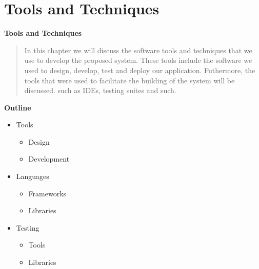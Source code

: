 
\section{Tools and Techniques}

\vspace{20mm}

\Huge{\textbf{Tools and Techniques}}

\vspace{20mm}




\begin{abstract}
    In this chapter we will discuss the software tools and techniques that we use to develop the proposed system. These tools include the software we used to design, develop, test and deploy our application. Futhermore, the tools that were used to facilitate the building of the system will be discussed. such as IDEs, testing suites and such.

\end{abstract}

\vspace{20mm}

\large{\textbf{Outline}}

\begin{center}
    \begin{itemize}
        \item Tools
              \begin{itemize}
                  \item Design
                  \item Development
              \end{itemize}
        \item Languages
              \begin{itemize}
                  \item Frameworks
                  \item Libraries
              \end{itemize}
        \item Testing
              \begin{itemize}
                  \item Tools
                  \item Libraries
              \end{itemize}

    \end{itemize}
\end{center}
\pagebreak








